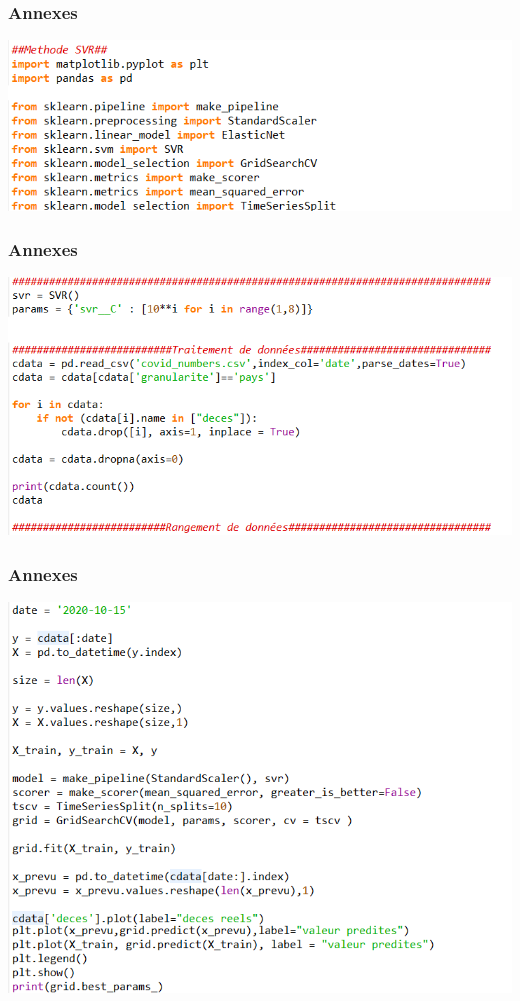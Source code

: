 \documentclass{beamer}[aspectratio = 43]
\begin{document}
\begin{frame}
	\frametitle{Annexes}
	\includegraphics[scale=0.6]{code_svr0}
\end{frame}

\begin{frame}
	\frametitle{Annexes}
	\includegraphics[scale=0.55]{code_svr1}%
\end{frame}

\begin{frame}
	\frametitle{Annexes}
	\includegraphics[scale=0.52]{code_svr2}
\end{frame}
\end{document}
